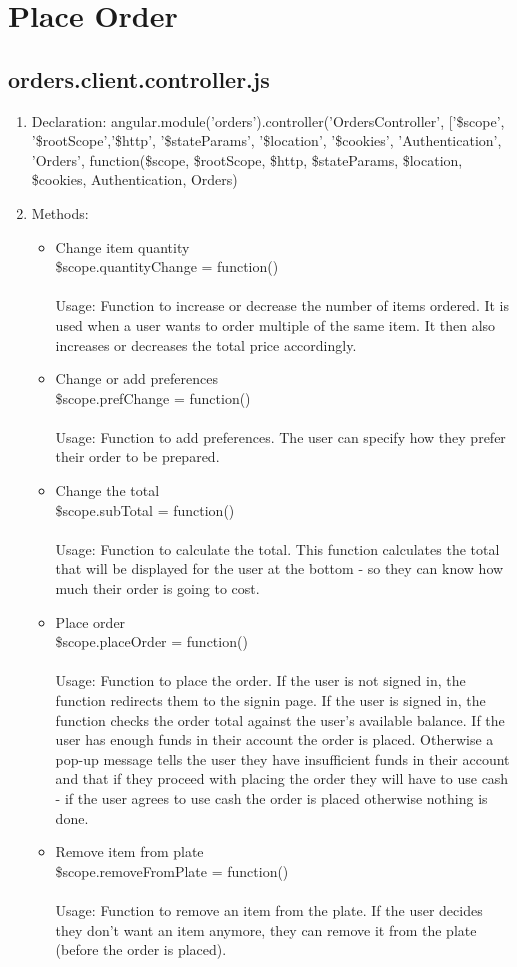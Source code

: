 \documentclass[a4paper,12pt]{report}
\begin{document}
\section{Place Order}
\subsection{orders.client.controller.js}
\begin{enumerate}
\item Declaration: angular.module('orders').controller('OrdersController', ['\$scope', '\$rootScope','\$http', '\$stateParams', '\$location', '\$cookies', 'Authentication', 'Orders',
function(\$scope, \$rootScope, \$http, \$stateParams, \$location, \$cookies, Authentication, Orders)  
\item Methods:
\begin{itemize}
\item Change item quantity \\ \$scope.quantityChange = function() 
\\ \\ Usage: Function to increase or decrease the number of items ordered. It is used when a user wants to order multiple of the same item. It then also increases or decreases the total price accordingly.
\item Change or add preferences \\ \$scope.prefChange = function() 
\\ \\ Usage: Function to add preferences. The user can specify how they prefer their order to be prepared.
\item Change the total \\ \$scope.subTotal = function() 
\\ \\ Usage: Function to calculate the total. This function calculates the total that will be displayed for the user at the bottom - so they can know how much their order is going to cost.
\item Place order \\ \$scope.placeOrder = function()
\\ \\ Usage: Function to place the order. If the user is not signed in, the function redirects them to the signin page. If the user is signed in, the function checks the order total against the user's available balance. If the user has enough funds in their account the order is placed. Otherwise a pop-up message tells the user they have insufficient funds in their account and that if they proceed with placing the order they will have to use cash - if the user agrees to use cash the order is placed otherwise nothing is done.
\item Remove item from plate \\ \$scope.removeFromPlate = function()
\\ \\ Usage: Function to remove an item from the plate. If the user decides they don't want an item anymore, they can remove it from the plate (before the order is placed).
\end{itemize}
\end{enumerate}
\end{document}
